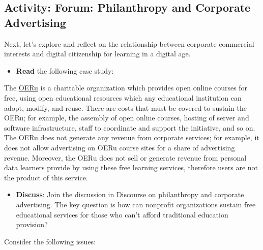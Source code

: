 \documentclass[
  letterpaper,
  DIV=11,
  numbers=noendperiod]{scrreprt}
\providecommand{\tightlist}{%
  \setlength{\itemsep}{0pt}\setlength{\parskip}{0pt}}\usepackage{longtable,booktabs,array}
\begin{document}
\subsection{Activity: Forum: Philanthropy and Corporate
Advertising}\label{activity-forum-philanthropy-and-corporate-advertising}

\begin{tcolorbox}[enhanced jigsaw, toprule=.15mm, colback=white, colframe=quarto-callout-note-color-frame, bottomtitle=1mm, leftrule=.75mm, coltitle=black, titlerule=0mm, rightrule=.15mm, colbacktitle=quarto-callout-note-color!10!white, left=2mm, title={Learning Activity}, opacitybacktitle=0.6, opacityback=0, breakable, toptitle=1mm, arc=.35mm, bottomrule=.15mm]

Next, let's explore and reflect on the relationship between corporate
commercial interests and digital citizenship for learning in a digital
age.

\begin{itemize}
\tightlist
\item
  \textbf{Read} the following case study:
\end{itemize}

The \href{https://oeru.org/}{OERu} is a charitable organization which
provides open online courses for free, using open educational resources
which any educational institution can adopt, modify, and reuse. There
are costs that must be covered to sustain the OERu; for example, the
assembly of open online courses, hosting of server and software
infrastructure, staff to coordinate and support the initiative, and so
on. The OERu does not generate any revenue from corporate services; for
example, it does not allow advertising on OERu course sites for a share
of advertising revenue. Moreover, the OERu does not sell or generate
revenue from personal data learners provide by using these free learning
services, therefore users are not the product of this service.

\begin{itemize}
\tightlist
\item
  \textbf{Discuss}: Join the discussion in Discourse on philanthropy and
  corporate advertising. The key question is how can nonprofit
  organizations sustain free educational services for those who can't
  afford traditional education provision?
\end{itemize}

Consider the following issues:


\end{tcolorbox}
\end{document}
